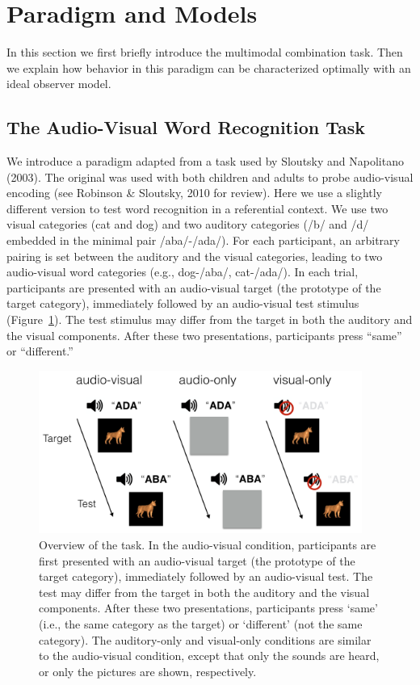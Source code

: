 \documentclass[english,,man,floatsintext]{apa6}
\theoremstyle{definition}
\theoremstyle{definition}
\theoremstyle{definition}
\theoremstyle{remark}
\begin{document}
\section{Paradigm and Models}\label{paradigm-and-models}

In this section we first briefly introduce the multimodal combination
task. Then we explain how behavior in this paradigm can be characterized
optimally with an ideal observer model.

\subsection{The Audio-Visual Word Recognition
Task}\label{the-audio-visual-word-recognition-task}

We introduce a paradigm adapted from a task used by Sloutsky and
Napolitano (2003). The original was used with both children and adults
to probe audio-visual encoding (see Robinson \& Sloutsky, 2010 for
review). Here we use a slightly different version to test word
recognition in a referential context. We use two visual categories (cat
and dog) and two auditory categories (/b/ and /d/ embedded in the
minimal pair /aba/-/ada/). For each participant, an arbitrary pairing is
set between the auditory and the visual categories, leading to two
audio-visual word categories (e.g., dog-/aba/, cat-/ada/). In each
trial, participants are presented with an audio-visual target (the
prototype of the target category), immediately followed by an
audio-visual test stimulus (Figure~\ref{fig:task}). The test stimulus
may differ from the target in both the auditory and the visual
components. After these two presentations, participants press
\enquote{same} or \enquote{different.}

\begin{figure}

{\centering \includegraphics[width=400px]{pictures/task} 

}

\caption{Overview of the task. In the audio-visual condition, participants are first presented with an audio-visual target (the prototype of the target category), immediately followed by an audio-visual test. The test may differ from the target in both the auditory and the visual components. After these two presentations, participants press `same' (i.e., the same category as the target) or `different' (not the same category). The auditory-only and visual-only conditions are similar to the audio-visual condition, except that only the sounds are heard, or only the pictures are shown, respectively.}\label{fig:task}
\end{figure}
\end{document}
